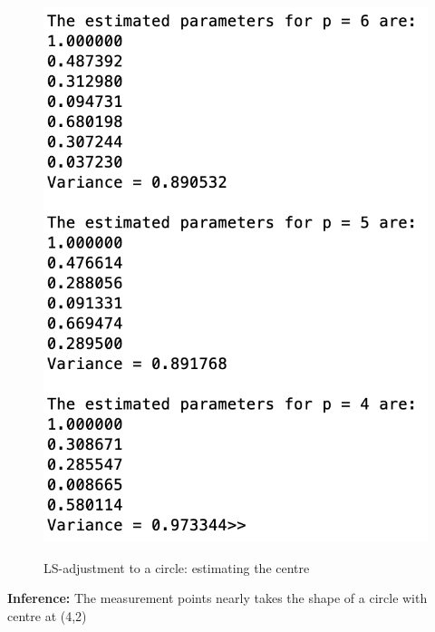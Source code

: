 \begin{figure}[H]
\centering
{\includegraphics[scale=0.15]{ass6_2.png}}
\caption{LS-adjustment to a circle: estimating the centre }
\label{LS-adjustment to a circle: estimating the centre }
\end{figure}

\noindent \textbf{Inference:} The measurement points nearly takes the shape of a circle with centre at (4,2)



